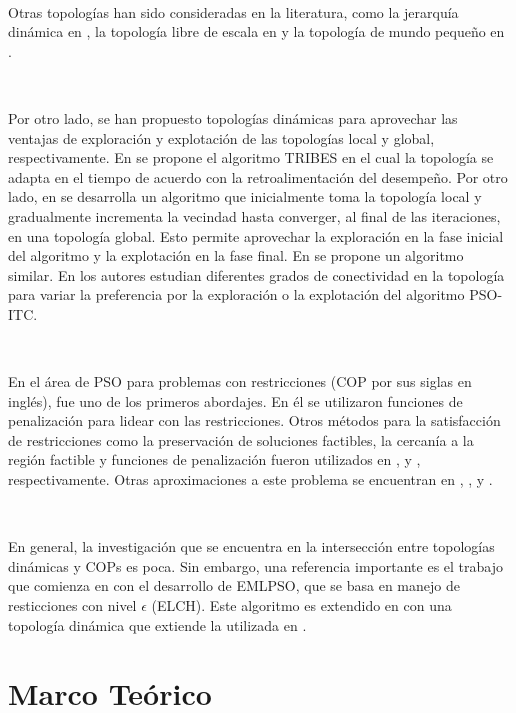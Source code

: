 \documentclass{article}
\begin{document}
\

Otras topologías han sido consideradas en la literatura, como la jerarquía dinámica en \cite{janson05}, la topología libre de escala en \cite{zhang11} y la topología de mundo pequeño en \cite{gong13}.

\

Por otro lado, se han propuesto topologías dinámicas para aprovechar las ventajas de exploración y explotación de las topologías local y global, respectivamente. En \cite{clerc06} se propone el algoritmo TRIBES en el cual la topología se adapta en el tiempo de acuerdo con la retroalimentación del desempeño. Por otro lado, en \cite{suganthan99} se desarrolla un algoritmo que inicialmente toma la topología local y gradualmente incrementa la vecindad hasta converger, al final de las iteraciones, en una topología global. Esto permite aprovechar la exploración en la fase inicial del algoritmo y la explotación en la fase final. En \cite{marinakis13} se propone un algoritmo similar. En \cite{lim14} los autores estudian diferentes grados de conectividad en la topología para variar la preferencia por la exploración o la explotación del algoritmo PSO-ITC.

\

En el área de PSO para problemas con restricciones (COP por sus siglas en inglés), \cite{parsopoulos02} fue uno de los primeros abordajes. En él se utilizaron funciones de penalización para lidear con las restricciones. Otros métodos para la satisfacción de restricciones como la preservación de soluciones factibles, la cercanía a la región factible y funciones de penalización fueron utilizados en  \cite{xiahoui02}, \cite{pulido04} y \cite{coath03}, respectivamente. Otras aproximaciones a este problema se encuentran en \cite{ulrich07}, \cite{he07}, \cite{bonyadi13} y \cite{elsayed13}.

\

En general, la investigación que se encuentra en la intersección entre topologías dinámicas y COPs es poca. Sin embargo, una referencia importante es el trabajo que comienza en \cite{bonyadi14} con el desarrollo de EMLPSO, que se basa en manejo de resticciones con nivel $\epsilon$ (ELCH). Este algoritmo es extendido en \cite{bonyadi14_2} con una topología dinámica que extiende la utilizada en \cite{suganthan99}.

\newpage
\section*{Marco Teórico}
\end{document}

